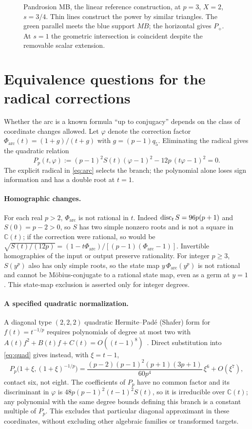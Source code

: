 \begin{figure}[htbp]
\centering\figMB
\caption{Pandrosion MB, the linear reference construction, at $p=3$, $X=2$, $s=3/4$. Thin lines
construct the power by similar triangles. The green parallel meets the blue support $MB$; the
horizontal gives $P_+$. At $s=1$ the geometric intersection is coincident despite the removable scalar
extension.}\label{fig:mb}
\end{figure}

\FloatBarrier
\section{Equivalence questions for the radical corrections}\label{app:equiv}

Whether the arc is a known formula ``up to conjugacy'' depends on the class of coordinate changes
allowed. Let $\varphi$ denote the correction factor $\Phi_{\mathrm{arc}}(t)=(1+g)/(t+g)$ with
$g=(p-1)q_5$. Eliminating the radical gives the quadratic relation
\begin{equation}\label{eq:quad}
P_p(t,\varphi):=(p-1)^{2}S(t)(\varphi-1)^{2}-12p\,(t\varphi-1)^{2}=0 .
\end{equation}
The explicit radical in \eqref{eq:arc} selects the branch; the polynomial alone loses sign information
and has a double root at $t=1$.

\paragraph{Homographic changes.}
For each real $p>2$, $\Phi_{\mathrm{arc}}$ is not rational in $t$. Indeed $\operatorname{disc}_tS=96p(p+1)$ and
$S(0)=p-2>0$, so $S$ has two simple nonzero roots and is not a square in $\mathbb{C}(t)$; if the
correction were rational, so would be
$\sqrt{S(t)/(12p)}=(1-t\Phi_{\mathrm{arc}})/[(p-1)(\Phi_{\mathrm{arc}}-1)]$. Invertible homographies of
the input or output preserve rationality. For integer $p\ge3$, $S(y^{p})$ also has only simple roots,
so the state map $y\,\Phi_{\mathrm{arc}}(y^{p})$ is not rational and cannot be M\"obius-conjugate to a
rational state map, even as a germ at $y=1$. This state-map exclusion is asserted only for integer
degrees.

\paragraph{A specified quadratic normalization.}
A diagonal type $(2,2,2)$ quadratic Hermite--Pad\'e (Shafer) form for $f(t)=t^{-1/p}$ requires
polynomials of degree at most two with $A(t)f^{2}+B(t)f+C(t)=O((t-1)^{8})$~\cite[eqs.~(1.4)--(1.6)]{cabay}.
Direct substitution into \eqref{eq:quad} gives instead, with $\xi=t-1$,
\[ P_p\bigl(1+\xi,(1+\xi)^{-1/p}\bigr)=\frac{(p-2)(p-1)^{2}(p+1)(3p+1)}{60p^{4}}\,\xi^{6}+O(\xi^{7}), \]
contact six, not eight. The coefficients of $P_p$ have no common factor and its discriminant in
$\varphi$ is $48p(p-1)^{2}(t-1)^{2}S(t)$, so it is irreducible over $\mathbb{C}(t)$; any polynomial
with the same degree bounds defining this branch is a constant multiple of $P_p$. This excludes that
particular diagonal approximant in these coordinates, without excluding other algebraic families or
transformed targets.

